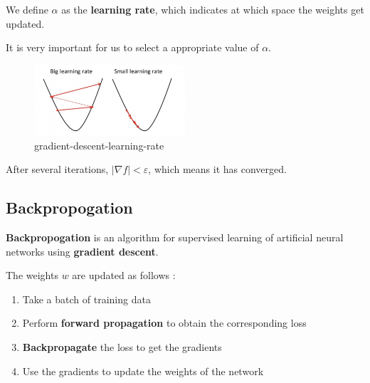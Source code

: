 \documentclass[11pt, a4paper]{article}
\begin{document}
We define $\alpha$ as the \textbf{learning rate}, which indicates at which space the weights get updated.

It is very important for us to select a appropriate value of $\alpha$.
\begin{figure}[H] %
    \centering
    \includegraphics[width=0.5\textwidth]{./fig/gradient-descent-learning-rate.png}
    \caption{gradient-descent-learning-rate}
    \label{fig:gradient-descent-learning-rate}
\end{figure}

After several iterations, $|\nabla f|< \varepsilon$, which means it has converged.

\subsection{Backpropogation}

\textbf{Backpropogation} is an algorithm for supervised learning of artificial neural networks using \textbf{gradient descent}.


\begin{tcolorbox}
The weights $w$ are updated as follows :
\begin{enumerate}
    \item Take a batch of training data
    \item Perform \textbf{forward propagation} to obtain the corresponding loss
    \item \textbf{Backpropagate} the loss to get the gradients
    \item Use the gradients to update the weights of the network
\end{enumerate}
\end{tcolorbox}
\end{document}
